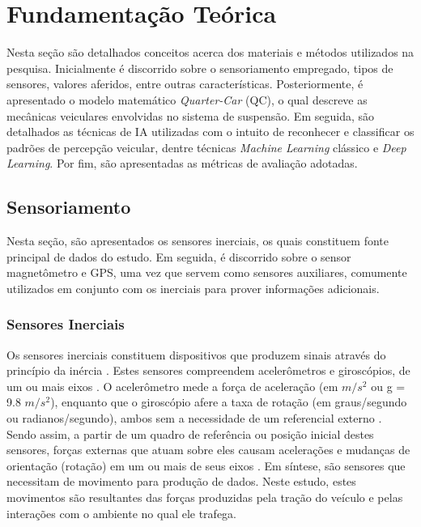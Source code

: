 \chapter{Fundamentação Teórica}
\label{cap:fundamentacao}

Nesta seção são detalhados conceitos acerca dos materiais e métodos utilizados na pesquisa. Inicialmente é discorrido sobre o sensoriamento empregado, tipos de sensores, valores aferidos, entre outras características. Posteriormente, é apresentado o modelo matemático \textit{Quarter-Car} (QC), o qual descreve as mecânicas veiculares envolvidas no sistema de suspensão. Em seguida, são detalhados as técnicas de IA utilizadas com o intuito de reconhecer e classificar os padrões de percepção veicular, dentre técnicas \textit{Machine Learning} clássico e \textit{Deep Learning}. Por fim, são apresentadas as métricas de avaliação adotadas.

\section{Sensoriamento}

Nesta seção, são apresentados os sensores inerciais, os quais constituem fonte principal de dados do estudo. Em seguida, é discorrido sobre o sensor magnetômetro e GPS, uma vez que servem como sensores auxiliares, comumente utilizados em conjunto com os inerciais para prover informações adicionais. 

\subsection{Sensores Inerciais}

Os sensores inerciais constituem dispositivos que produzem sinais através do princípio da inércia \cite{Braga2017}. Estes sensores compreendem acelerômetros e giroscópios, de um ou mais eixos \cite{Beeby2004}. O acelerômetro mede a força de aceleração (em $m/s^2$ ou g = 9.8 $m/s^2$), enquanto que o giroscópio afere a taxa de rotação (em graus/segundo ou radianos/segundo), ambos sem a necessidade de um referencial externo \cite{Groves2013}. Sendo assim, a partir de um quadro de referência ou posição inicial destes sensores, forças externas que atuam sobre eles causam acelerações e mudanças de orientação (rotação) em um ou mais de seus eixos \cite{Kempe2011}. Em síntese, são sensores que necessitam de movimento para produção de dados. Neste estudo, estes movimentos são resultantes das forças produzidas pela tração do veículo e pelas interações com o ambiente no qual ele trafega.

